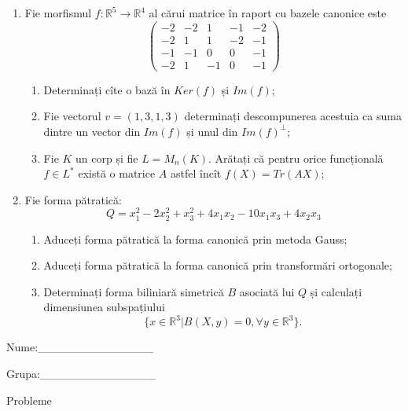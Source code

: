 \documentclass{article}
\begin{document}
\begin{enumerate}
 \item Fie morfismul $f:\mathbb{R}^5 \to \mathbb{R}^4$ al cărui matrice în raport cu bazele canonice este
$$\begin{pmatrix}
-2&-2&1&-1&-2\\
-2&1&1&-2&-1\\
-1&-1&0&0&-1\\
-2&1&-1&0&-1
\end{pmatrix}$$

\begin{enumerate}
\item Determinați cîte o bază în $Ker(f)$ și $Im(f)$;
\item Fie vectorul $v=(1,3,1,3)$ determinați descompunerea acestuia ca suma dintre un vector din $Im(f)$ și unul din $Im(f)^\perp$;
\item Fie $K$ un corp și fie $L=M_n(K)$. Arătați că pentru orice funcțională $f \in L^*$ există o matrice $A$ astfel încît $f(X)=Tr(AX)$;
\end{enumerate}
\item Fie forma pătratică:
$$Q= x_1^2-2x_2^2+x_3^2+4x_1x_2-10x_1x_3+4x_2x_3$$

\begin{enumerate}
\item Aduceți forma pătratică la forma canonică prin metoda Gauss;
\item Aduceți forma pătratică la forma canonică prin transformări ortogonale;
\item Determinați forma biliniară simetrică $B$ asociată lui $Q$ și calculați dimensiunea subspațiului
$$\{x \in \mathbb{R}^3 | B(X,y)=0,\forall y \in \mathbb{R}^3\}.$$

\end{enumerate}
\end{enumerate}
\newpage
\begin{flushright}
Nume:\_\_\_\_\_\_\_\_\_\_\_\_\_\_
 
 
Grupa:\_\_\_\_\_\_\_\_\_\_\_\_\_\_
\end{flushright}
\begin{center}
\vspace{2cm}
{\Large Probleme}
\vspace{2cm}
\end{center}
\end{document}
